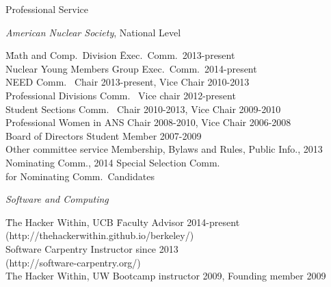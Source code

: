 \documentclass{resume2} %
\begin{document}

\begin{rSection}{Professional Service}

\textit{American Nuclear Society}, National Level
\begin{tabbing}
\hspace*{2 em}\= Math and Comp.\ Division \hspace*{6em} \= Exec.\ Comm.\ 2013-present \\
%
\> Nuclear Young Members Group \> Exec.\ Comm.\ 2014-present\\
%
\> NEED Comm.\ \> Chair 2013-present, Vice Chair 2010-2013\\
%
\> Professional Divisions Comm.\ \>	Vice chair 2012-present \\
%
\> Student Sections Comm.\ \> Chair 2010-2013, Vice Chair 2009-2010\\
%
\> Professional Women in ANS	\> Chair 2008-2010, Vice Chair 2006-2008\\	
%
\> Board of Directors \>	Student Member 2007-2009\\
%
\> Other committee service \>	Membership, Bylaws and Rules, Public Info., 2013 \\ \> \> Nominating Comm., 2014 Special Selection Comm.\ \\ \> \> for Nominating Comm.\ Candidates
\end{tabbing}

\vspace*{-.5em}
\textit{Software and Computing}
\begin{tabbing}
\hspace*{2 em}\= The Hacker Within, UCB \hspace*{6em} \= Faculty Advisor 2014-present\\
\>(http://thehackerwithin.github.io/berkeley/)\\
%
\> Software Carpentry  \> Instructor since 2013\\
\> (http://software-carpentry.org/)\\
%
\> The Hacker Within, UW \> Bootcamp instructor 2009, Founding member 2009
\end{tabbing}


\end{rSection}
\end{document}
